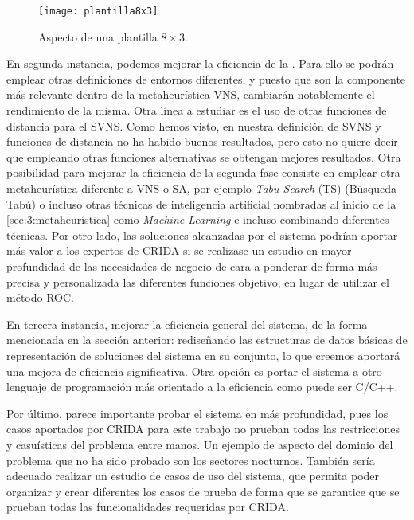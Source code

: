 \begin{figure}
	\centering
	\texttt{[image: plantilla8x3]}
	\caption{Aspecto de una plantilla $8\times3$.}
	\label{fig:6:plantilla8x3}
\end{figure}

En segunda instancia, podemos mejorar la eficiencia de la \fasedos{}. Para ello se podrán emplear otras definiciones de entornos diferentes, y puesto que son la componente más relevante dentro de la metaheurística VNS, cambiarán notablemente el rendimiento de la misma. 
Otra línea a estudiar es el uso de otras funciones de distancia para el SVNS. Como hemos visto, en nuestra definición de SVNS y funciones de distancia no ha habido buenos resultados, pero esto no quiere decir que empleando otras funciones alternativas se obtengan mejores resultados. Otra posibilidad para mejorar la eficiencia de la segunda fase consiste en emplear otra metaheurística diferente a VNS o SA, por ejemplo \textit{Tabu Search} (TS) (Búsqueda Tabú) o incluso otras técnicas de inteligencia artificial nombradas al inicio de la \autoref{sec:3:metaheurística} como \textit{Machine Learning} e incluso combinando diferentes técnicas.
Por otro lado, las soluciones alcanzadas por el sistema podrían aportar más valor a los expertos de CRIDA si se realizase un estudio en mayor profundidad de las necesidades de negocio de cara a ponderar de forma más precisa y personalizada las diferentes funciones objetivo, en lugar de utilizar el método ROC.

En tercera instancia, mejorar la eficiencia general del sistema, de la forma mencionada en la sección anterior: rediseñando las estructuras de datos básicas de representación de soluciones del sistema en su conjunto, lo que creemos aportará una mejora de eficiencia significativa. Otra opción es portar el sistema a otro lenguaje de programación más orientado a la eficiencia como puede ser C/C++. 

Por último, parece importante probar el sistema en más profundidad, pues los casos aportados por CRIDA para este trabajo no prueban todas las restricciones y casuísticas del problema entre manos. Un ejemplo de aspecto del dominio del problema que no ha sido probado son los sectores nocturnos. También sería adecuado realizar un estudio de casos de uso del sistema, que permita poder organizar y crear diferentes los casos de prueba de forma que se garantice que se prueban todas las funcionalidades requeridas por CRIDA.
